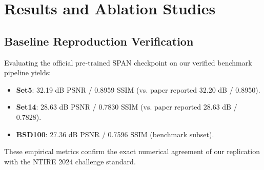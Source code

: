 \documentclass[conference]{IEEEtran}
\begin{document}
\section{Results and Ablation Studies}

\subsection{Baseline Reproduction Verification}
Evaluating the official pre-trained SPAN checkpoint on our verified benchmark pipeline yields:
\begin{itemize}
    \item \textbf{Set5}: 32.19 dB PSNR / 0.8959 SSIM (vs. paper reported 32.20 dB / 0.8950).
    \item \textbf{Set14}: 28.63 dB PSNR / 0.7830 SSIM (vs. paper reported 28.63 dB / 0.7828).
    \item \textbf{BSD100}: 27.36 dB PSNR / 0.7596 SSIM (benchmark subset).
\end{itemize}
These empirical metrics confirm the exact numerical agreement of our replication with the NTIRE 2024 challenge standard.

\begin{table}[t]
\caption{Quantitative benchmark comparison for scale factor $\times 4$. All metrics evaluated on Y-channel (4-pixel crop border). Peak values in \textbf{bold}.}
\centering
\renewcommand{\arraystretch}{1.05}
\label{tab:main_results}
\end{table}
\end{document}
